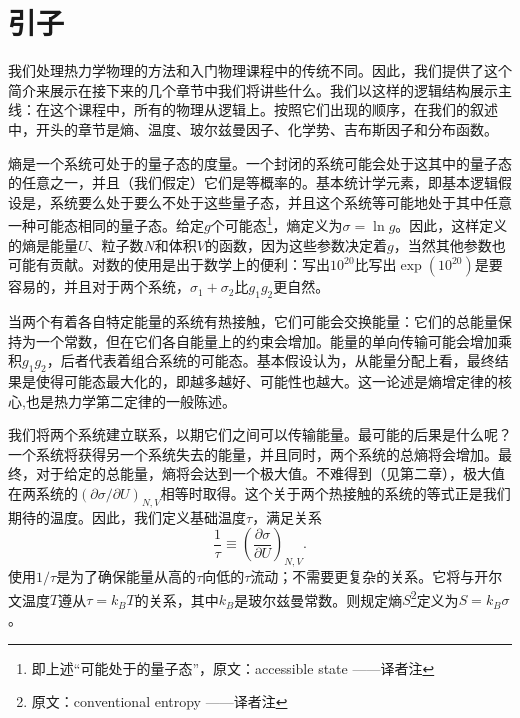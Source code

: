 \chapter*{引子}
 

我们处理热力学物理的方法和入门物理课程中的传统不同。因此，我们提供了这个简介来展示在接下来的几个章节中我们将讲些什么。我们以这样的逻辑结构展示主线：在这个课程中，所有的物理从逻辑上。按照它们出现的顺序，在我们的叙述中，开头的章节是熵、温度、玻尔兹曼因子、化学势、吉布斯因子和分布函数。

熵是一个系统可处于的量子态的度量。一个封闭的系统可能会处于这其中的量子态的任意之一，并且（我们假定）它们是等概率的。基本统计学元素，即基本逻辑假设是，系统要么处于要么不处于这些量子态，并且这个系统等可能地处于其中任意一种可能态相同的量子态。给定$g$个可能态\footnote{即上述“可能处于的量子态”，原文：accessible state ——译者注}，熵定义为$\sigma=\ln g$。因此，这样定义的熵是能量$U$、粒子数$N$和体积$V$的函数，因为这些参数决定着$g$，当然其他参数也可能有贡献。对数的使用是出于数学上的便利：写出$10^{20}$比写出$\exp({10^{20}})$是要容易的，并且对于两个系统，$\sigma_1+\sigma_2$比$g_1g_2$更自然。

当两个有着各自特定能量的系统有热接触，它们可能会交换能量：它们的总能量保持为一个常数，但在它们各自能量上的约束会增加。能量的单向传输可能会增加乘积$g_1g_2$，后者代表着组合系统的可能态。基本假设认为，从能量分配上看，最终结果是使得可能态最大化的，即越多越好、可能性也越大。这一论述是熵增定律的核心,也是热力学第二定律的一般陈述。

我们将两个系统建立联系，以期它们之间可以传输能量。最可能的后果是什么呢？一个系统将获得另一个系统失去的能量，并且同时，两个系统的总熵将会增加。最终，对于给定的总能量，熵将会达到一个极大值。不难得到（见第二章），极大值在两系统的$(\partial\sigma/\partial U)_{N,V}$相等时取得。这个关于两个热接触的系统的等式正是我们期待的温度。因此，我们定义基础温度$\tau$，满足关系
\begin{equation}
    \frac 1\tau \equiv (\frac{\partial\sigma}{\partial U})_{N,V}.\label{DefOfT}
\end{equation}
使用$1/\tau$是为了确保能量从高的$\tau$向低的$\tau$流动；不需要更复杂的关系。它将与开尔文温度$T$遵从$\tau=k_BT$的关系，其中$k_B$是玻尔兹曼常数。则规定熵$S$\footnote{原文：conventional entropy ——译者注}定义为$S=k_B\sigma$。

